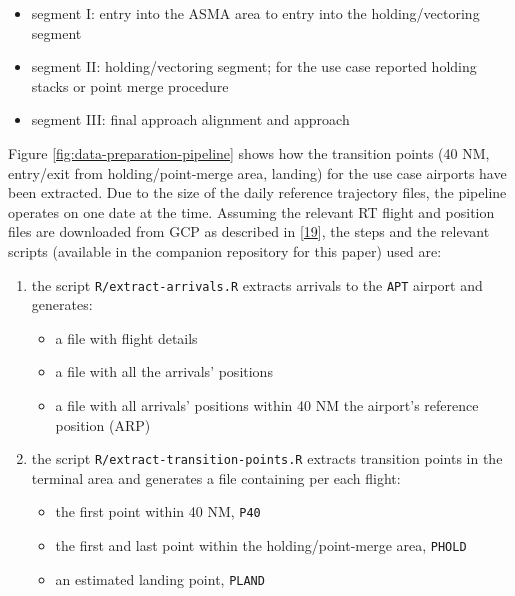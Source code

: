 \documentclass[conference,final,a4paper,]{IEEEtran}
\providecommand{\tightlist}{%
  \setlength{\itemsep}{0pt}\setlength{\parskip}{0pt}}
\begin{document}
\begin{itemize}
\tightlist
\item
  segment I: entry into the ASMA area to entry into the
  holding/vectoring segment
\item
  segment II: holding/vectoring segment; for the use case reported
  holding stacks or point merge procedure
\item
  segment III: final approach alignment and approach
\end{itemize}

Figure \ref{fig:data-preparation-pipeline} shows how the transition
points (40 NM, entry/exit from holding/point-merge area, landing) for
the use case airports have been extracted. Due to the size of the daily
reference trajectory files, the pipeline operates on one date at the
time. Assuming the relevant RT flight and position files are downloaded
from GCP as described in
{[}\protect\hyperlink{ref-performancereviewunit_2019}{19}{]}, the steps
and the relevant scripts (available in the companion repository for this
paper) used are:

\begin{enumerate}
\def\labelenumi{\arabic{enumi}.}
\item
  the script \texttt{R/extract-arrivals.R} extracts arrivals to the
  \texttt{APT} airport and generates:

  \begin{itemize}
  \tightlist
  \item
    a file with flight details
  \item
    a file with all the arrivals' positions
  \item
    a file with all arrivals' positions within 40 NM the airport's
    reference position (ARP)
  \end{itemize}
\item
  the script \texttt{R/extract-transition-points.R} extracts transition
  points in the terminal area and generates a file containing per each
  flight:

  \begin{itemize}
  \tightlist
  \item
    the first point within 40 NM, \texttt{P40}
  \item
    the first and last point within the holding/point-merge area,
    \texttt{PHOLD}
  \item
    an estimated landing point, \texttt{PLAND}
  \end{itemize}
\end{enumerate}
\end{document}
